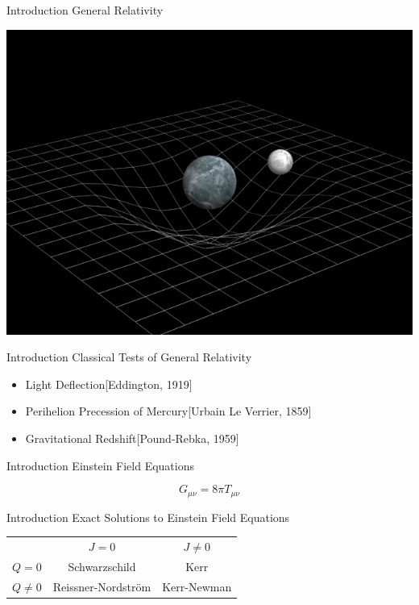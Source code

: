 \documentclass[xcolor=dvipsnames]{beamer}
\begin{document}
	\begin{frame}{Introduction}
		General Relativity
		\begin{center}
			\includegraphics[scale=0.4]{curvature.jpg}
		\end{center}
	\end{frame}
	\begin{frame}{Introduction}
		Classical Tests of General Relativity
		\begin{itemize}
			\item{Light Deflection[Eddington, 1919]}
			\item{Perihelion Precession of Mercury[Urbain Le Verrier, 1859]}
			\item{Gravitational Redshift[Pound-Rebka, 1959]}
		\end{itemize}
	\end{frame}
	\begin{frame}{Introduction}
		Einstein Field Equations
		\huge
		\begin{center}
			\[
			G_{\mu\nu} = 8\pi T_{\mu\nu}
			\]
		\end{center}
	\end{frame}
	\begin{frame}{Introduction}
		Exact Solutions to Einstein Field Equations
		\begin{center}
			\Large
			\begin{tabular}{|c c c|}
				\hline
				\cellcolor[gray]{0.7}~ & \cellcolor[gray]{0.9}$J=0$ & $J \ne 0$ \\
				\rowcolor[gray]{0.9}$Q=0$ & \cellcolor[gray]{1.0}Schwarzschild & \cellcolor[gray]{0.7}Kerr \\
				\cellcolor[gray]{1.0}$Q\ne 0$ & \cellcolor[gray]{0.7}Reissner-Nordstr\"{o}m & \cellcolor[gray]{0.9}Kerr-Newman\\ \hline
			\end{tabular}
		\end{center}
	\end{frame}
\end{document}
